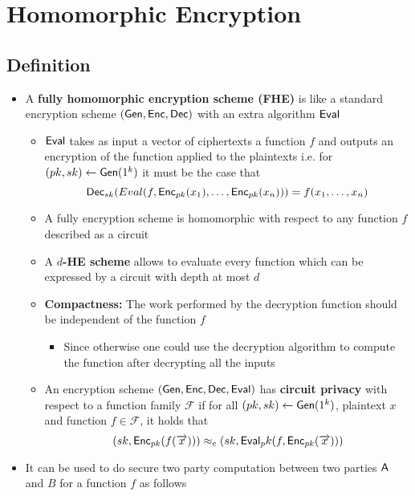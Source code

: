 \section{Homomorphic Encryption}
\localtableofcontents
\subsection{Definition}
\begin{itemize}
    \item A \textbf{fully homomorphic encryption scheme (FHE)}  is like a standard encryption scheme $(\mathsf{Gen}, \mathsf{Enc}, \mathsf{Dec})$ with an extra algorithm $\mathsf{Eval}$
    \begin{itemize}
        \item $\mathsf{Eval}$ takes as input a vector of ciphertexts a function $f$ and outputs an encryption of the function applied to the plaintexts i.e. for $(pk, sk) \leftarrow \mathsf{Gen}(1^k)$ it must be the case that
        \begin{equation*}
            \mathsf{Dec}_{sk}(Eval(f, \mathsf{Enc}_{pk}(x_1), \dots, \mathsf{Enc}_{pk}(x_n))) = f(x_1, \dots, x_n)
        \end{equation*}
        \item A fully encryption scheme is homomorphic with respect to any function $f$ described as a circuit
        \item A \textbf{$d$-HE scheme} allows to evaluate every function which can be expressed by a circuit with depth at most $d$ 
        \item \textbf{Compactness:} The work performed by the decryption function should be independent of the function $f$
        \begin{itemize}
            \item Since otherwise one could use the decryption algorithm to compute the function after decrypting all the inputs
        \end{itemize}
        \item An encryption scheme $(\mathsf{Gen}, \mathsf{Enc}, \mathsf{Dec}, \mathsf{Eval})$ has \textbf{circuit privacy} with respect to a function family $\mathcal{F}$ if for all $(pk, sk) \leftarrow \mathsf{Gen}(1^k)$, plaintext $x$ and function $f \in \mathcal F$, it holds that
        \begin{equation*}
            (sk, \mathsf{Enc}_{pk}(f(\overrightarrow x))) \approx_c (sk, \mathsf{Eval}_pk(f, \mathsf{Enc}_{pk}(\overrightarrow x)))
        \end{equation*}
    \end{itemize}
    \item It can be used to do secure two party computation between two parties $\mathsf{A}$ and $B$ for a function $f$ as follows

\end{itemize}

